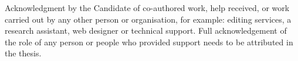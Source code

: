 Acknowledgment by the Candidate of co-authored work, help received, or work carried out by any other person or organisation, for example: editing services, a research assistant, web designer or technical support. Full acknowledgement of the role of any person or people who provided support needs to be attributed in the thesis.